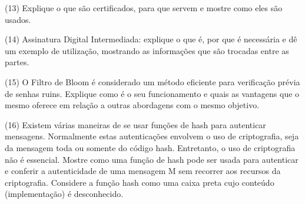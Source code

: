 \documentclass[10pt,a4paper]{report}
\begin{document}
(13) Explique o que são certificados, para que servem e mostre como eles são usados.

(14) Assinatura Digital Intermediada: explique o que é, por que é necessária e dê um exemplo de utilização, mostrando as informações que são trocadas entre as partes.

(15) O Filtro de Bloom é considerado um método eficiente para verificação prévia de senhas ruins. Explique como é o seu funcionamento e quais as vantagens que o mesmo oferece em relação a outras abordagens com o mesmo objetivo.

(16) Existem várias maneiras de se usar funções de hash para autenticar mensagens. Normalmente estas autenticações envolvem o uso de criptografia, seja da mensagem toda ou somente do código hash. Entretanto, o uso de criptografia não é essencial. Mostre como uma função de hash pode ser usada para autenticar e conferir a autenticidade de uma mensagem M sem recorrer aos recursos da criptografia. Considere a função hash como uma caixa preta cujo conteúdo (implementação) é desconhecido.
\end{document}
